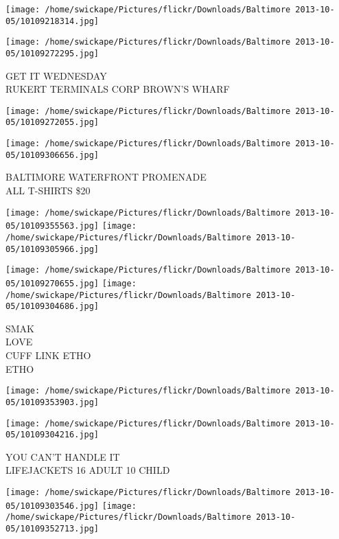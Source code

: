\documentclass[10pt,letterpaper]{article}
\begin{document}
\texttt{[image: /home/swickape/Pictures/flickr/Downloads/Baltimore 2013-10-05/10109218314.jpg]}

\vspace{0.25in}
\texttt{[image: /home/swickape/Pictures/flickr/Downloads/Baltimore 2013-10-05/10109272295.jpg]}

GET IT WEDNESDAY\\
RUKERT TERMINALS CORP BROWN'S WHARF\\
\pagebreak

\texttt{[image: /home/swickape/Pictures/flickr/Downloads/Baltimore 2013-10-05/10109272055.jpg]}

\vspace{0.25in}
\texttt{[image: /home/swickape/Pictures/flickr/Downloads/Baltimore 2013-10-05/10109306656.jpg]}

BALTIMORE WATERFRONT PROMENADE\\
ALL T{-}SHIRTS \$20\\
\pagebreak

\texttt{[image: /home/swickape/Pictures/flickr/Downloads/Baltimore 2013-10-05/10109355563.jpg]}
\texttt{[image: /home/swickape/Pictures/flickr/Downloads/Baltimore 2013-10-05/10109305966.jpg]}

\texttt{[image: /home/swickape/Pictures/flickr/Downloads/Baltimore 2013-10-05/10109270655.jpg]}
\texttt{[image: /home/swickape/Pictures/flickr/Downloads/Baltimore 2013-10-05/10109304686.jpg]}

SMAK\\
LOVE\\
CUFF LINK ETHO\\
ETHO\\
\pagebreak

\texttt{[image: /home/swickape/Pictures/flickr/Downloads/Baltimore 2013-10-05/10109353903.jpg]}

\vspace{0.25in}
\texttt{[image: /home/swickape/Pictures/flickr/Downloads/Baltimore 2013-10-05/10109304216.jpg]}

YOU CAN'T HANDLE IT\\
LIFEJACKETS 16 ADULT 10 CHILD\\
\pagebreak

\texttt{[image: /home/swickape/Pictures/flickr/Downloads/Baltimore 2013-10-05/10109303546.jpg]}
\texttt{[image: /home/swickape/Pictures/flickr/Downloads/Baltimore 2013-10-05/10109352713.jpg]}
\end{document}
